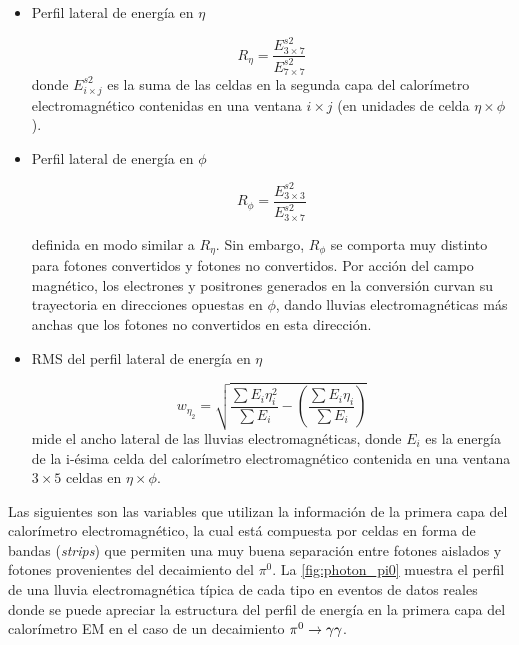 \begin{itemize}\itemsep0.2cm\parskip0.2cm
\item Perfil lateral de energía en $\eta$

  \begin{equation}
    R_\eta = \frac{E^{s2}_{3\times 7}}{E^{s2}_{7\times 7}}
  \end{equation}
%
  donde $E^{s2}_{i\times j}$ es la suma de las celdas en la segunda capa del calorímetro
  electromagnético contenidas en una ventana $i \times j$ (en unidades de celda $\eta \times \phi$).

\item Perfil lateral de energía en $\phi$

  \begin{equation}
    R_\phi = \frac{E^{s2}_{3\times 3}}{E^{s2}_{3\times 7}}
  \end{equation}

  definida en modo similar a $R_\eta$.
  Sin embargo, $R_\phi$ se comporta muy distinto para fotones convertidos y
  fotones no convertidos. Por acción del campo magnético, los electrones y positrones
  generados en la conversión curvan su trayectoria en direcciones opuestas en $\phi$,
  dando lluvias electromagnéticas más anchas que los fotones no convertidos en esta dirección.


  \item RMS del perfil lateral de energía en $\eta$

  \begin{equation}
    w_{\eta_2} = \sqrt{ \frac{\sum E_i \eta_i^2}{\sum E_i} - \left( \frac{\sum E_i \eta_i}{\sum E_i} \right) }
  \end{equation}
  mide el ancho lateral de las lluvias electromagnéticas, donde $E_i$ es la energía de la i-ésima celda del
  calorímetro electromagnético contenida en una ventana $3 \times 5$ celdas en $\eta \times \phi$.
\end{itemize}

Las siguientes son las variables que utilizan la información de la primera capa
del calorímetro electromagnético, la cual está compuesta por celdas en forma de
bandas (\emph{strips}) que permiten una muy buena separación entre fotones aislados y
fotones provenientes del decaimiento del $\pi^0$. La \cref{fig:photon_pi0}
muestra el perfil de una lluvia electromagnética típica de cada tipo en eventos
de datos reales donde se puede apreciar la estructura del perfil de energía en
la primera capa del calorímetro EM en el caso de un decaimiento $\pi^0 \to \gam\gam$.


